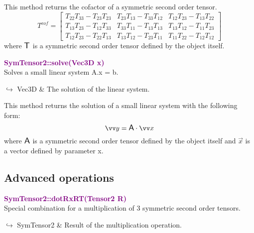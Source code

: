 This method returns the cofactor of a symmetric second order tensor.
\begin{equation*}
T^{cof} = \left[\begin{array}{ccc}
T_{22}T_{33}-T_{23}T_{23} & T_{23}T_{13}-T_{33}T_{12} & T_{12}T_{23}-T_{13}T_{22}\\
T_{13}T_{23}-T_{12}T_{33} & T_{33}T_{11}-T_{13}T_{13} & T_{13}T_{12}-T_{11}T_{23}\\
T_{12}T_{23}-T_{22}T_{13} & T_{13}T_{12}-T_{23}T_{11} & T_{11}T_{22}-T_{12}T_{12}
\end{array}
\right]
\end{equation*}
where $\mbox{\large\ensuremath{\mathsf{T}}}$ is a symmetric second order tensor defined by the object itself.

\textcolor{purple}{\textbf{SymTensor2::solve(Vec3D x)}}\label{SymTensor2::solve(Vec3D x)}\\
Solves a small linear system A.x = b.\vspace*{-0.5em}
\begin{tcolorbox}[grow to left by=-1cm, width=\textwidth-1cm,myArgs,tabularx={l|R}]
$\hookrightarrow$ Vec3D & The solution of the linear system.
\end{tcolorbox}

This method returns the solution of a small linear system with the following form:
\begin{equation*}
\overrightarrow{y} = \A \cdot \overrightarrow{x}
\end{equation*}
where $\mbox{\large\ensuremath{\mathsf{A}}}$ is a symmetric second order tensor defined by the object itself and $\overrightarrow{x}$ is a vector defined by parameter x.

\subsection{Advanced operations}

\textcolor{purple}{\textbf{SymTensor2::dotRxRT(Tensor2 R)}}\label{SymTensor2::dotRxRT(Tensor2 R)}\\
Special combination for a multiplication of 3 symmetric second order tensors.\vspace*{-0.5em}
\begin{tcolorbox}[grow to left by=-1cm, width=\textwidth-1cm,myArgs,tabularx={l|R}]
$\hookrightarrow$ SymTensor2 & Result of the multiplication operation.
\end{tcolorbox}

